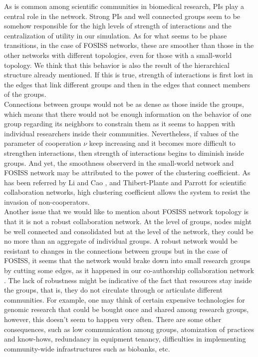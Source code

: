 \documentclass{bmcart}
\begin{document}
As is common among scientific communities in biomedical research, PIs play a
central role in the network. Strong PIs and well connected groups seem to be
somehow responsible for the high levels of strength of interactions and the
centralization of utility in our simulation. As for what seems to be phase
transitions, in the case of FOSISS networks, these are smoother than those in
the other networks with different topologies, even for those with a small-world
topology. We think that this behavior is also the result of the hierarchical
structure already mentioned. If this is true, strength of interactions is first
lost in the edges that link different groups and then in the edges that connect
members of the groups.\\

Connections between groups would not be as dense as those
inside the groups, which means that there would not be enough information on the
behavior of one group regarding its neighbors to constrain them as it seems to
happen with individual researchers inside their communities. Nevertheless, if
values of the parameter of cooperation $\nu$ keep increasing and it becomes more
difficult to strengthen interactions, then strength of interactions begins to
diminish inside groups. {\color {red}And yet, the smoothness observerd in the small-world
network and FOSISS network may be attributed to the power of the clustering
coefficient. As has been referred by Li and Cao \cite{Li-etal:2009}, and
Thibert-Plante and Parrott \cite{Thibert-Plante-etal:2007} for scientific
collaboration networks, high clustering coefficient allows the system to resist
the invasion of non-cooperators.}\\ 

Another issue that we would like to mention about FOSISS network topology is
that it is not a robust collaboration network.  At the level of groups, nodes
might be well connected and consolidated but at the level of the network, they
could be no more than an aggregate of individual groups. A robust network would
be resistant to changes in the connections between groups but in the case of
FOSISS, it seems that the network would brake down into small research groups by
cutting some edges, as it happened in our co-authorship collaboration network
\cite{HernandezLemus:2013}. The lack of robustness might be indicative of the
fact that resources stay inside the groups, that is, they do not circulate
through or articulate different communities. For example, one may think of
certain expensive technologies for genomic research that could be bought once
and shared among research groups, however, this doesn't seem to happen very
often. There are some other consequences, such as low communication among
groups, atomization of practices and know-hows, redundancy in equipment tenancy,
difficulties in implementing community-wide infrastructures such as biobanks,
etc. \\
\end{document}
